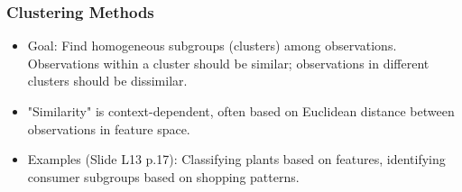 \documentclass[12pt,a4paper]{article}
\begin{document}
    \subsubsection{Clustering Methods }
        \begin{itemize}
            \item Goal: Find homogeneous subgroups (clusters) among observations. Observations within a cluster should be similar; observations in different clusters should be dissimilar.
            \item "Similarity" is context-dependent, often based on Euclidean distance between observations in feature space.
            \item Examples (Slide L13 p.17): Classifying plants based on features, identifying consumer subgroups based on shopping patterns.
        \end{itemize}
\end{document}
